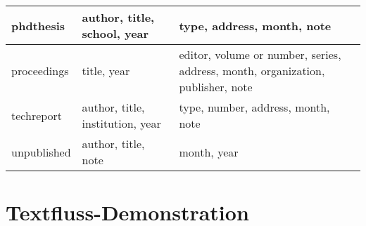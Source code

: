 \begin{table}[!h]
\begin{footnotesize}
\begin{tabular}{p{}p{}p{}}
phdthesis   &   author, title, school, year   &   type, address, month, note  \\  \hline
proceedings   &   title, year   &   editor, volume or number, series, address, month, organization, publisher, note  \\  \hline
techreport   &   author, title, institution, year   &   type, number, address, month, note  \\  \hline
unpublished   &   author, title, note   &   month, year  \\ 
\hline
\end{tabular} 
\end{footnotesize}
\end{table}





\chapter{Textfluss-Demonstration}
\lipsum 

















